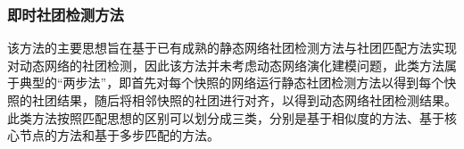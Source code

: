 \subsubsection{即时社团检测方法}
该方法的主要思想旨在基于已有成熟的静态网络社团检测方法与社团匹配方法实现对动态网络的社团检测，因此该方法并未考虑动态网络演化建模问题，此类方法属于典型的“两步法”，即首先对每个快照的网络运行静态社团检测方法以得到每个快照的社团结果，随后将相邻快照的社团进行对齐，以得到动态网络社团检测结果。此类方法按照匹配思想的区别可以划分成三类，分别是基于相似度的方法、基于核心节点的方法和基于多步匹配的方法。



